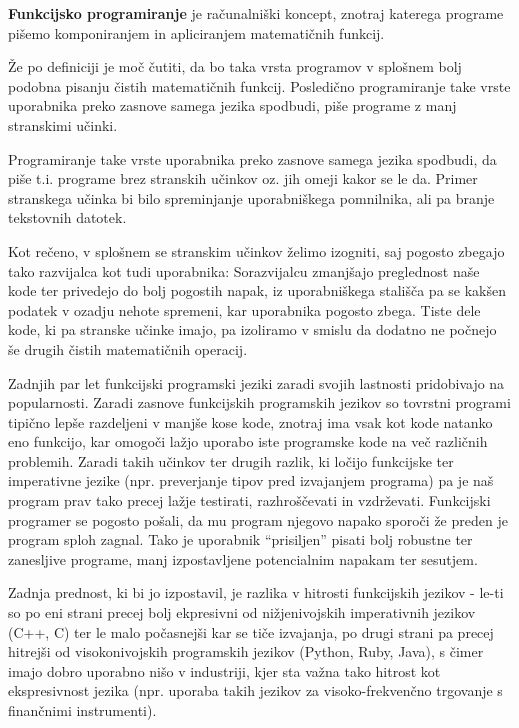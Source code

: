 \documentclass[mat1, tisk]{fmfdelo}
\begin{document}
\begin{definicija}
  \textbf{Funkcijsko programiranje} je računalniški koncept, znotraj katerega programe pišemo komponiranjem in apliciranjem matematičnih funkcij. 
\end{definicija}

Že po definiciji je moč čutiti, da bo taka vrsta programov v splošnem bolj podobna pisanju čistih matematičnih funkcij. Posledično programiranje take vrste uporabnika preko zasnove samega jezika
spodbudi, piše programe z manj stranskimi učinki.

Programiranje take vrste uporabnika preko zasnove samega jezika spodbudi, da piše t.i. programe brez stranskih učinkov oz. jih omeji kakor se le da. 
Primer stranskega učinka bi bilo spreminjanje uporabniškega pomnilnika, ali pa branje tekstovnih datotek.

Kot rečeno, v splošnem se stranskim učinkov želimo izogniti, saj pogosto zbegajo tako razvijalca kot tudi uporabnika: 
Sorazvijalcu zmanjšajo preglednost naše kode ter privedejo do bolj pogostih napak, iz uporabniškega stališča pa se kakšen podatek v ozadju nehote spremeni, kar uporabnika pogosto zbega. 
Tiste dele kode, ki pa stranske učinke imajo, pa izoliramo v smislu da dodatno ne počnejo še drugih čistih matematičnih operacij.


Zadnjih par let funkcijski programski jeziki zaradi svojih lastnosti pridobivajo na popularnosti. 
Zaradi zasnove funkcijskih programskih jezikov so tovrstni programi tipično lepše razdeljeni v manjše kose kode, znotraj ima vsak kot kode natanko eno funkcijo, 
kar omogoči lažjo uporabo iste programske kode na več različnih problemih. 
Zaradi takih učinkov ter drugih razlik, ki ločijo funkcijske ter imperativne jezike (npr. preverjanje tipov pred izvajanjem programa) pa je naš program prav tako precej lažje testirati, razhroščevati in vzdrževati. 
Funkcijski programer se pogosto pošali, da mu program njegovo napako sporoči že preden je program sploh zagnal. 
Tako je uporabnik ``prisiljen'' pisati bolj robustne ter zanesljive programe, manj izpostavljene potencialnim napakam ter sesutjem.

Zadnja prednost, ki bi jo izpostavil, je razlika v hitrosti funkcijskih jezikov - le-ti so po eni strani precej bolj ekpresivni od nižjenivojskih imperativnih jezikov (C++, C) 
ter le malo počasnejši kar se tiče izvajanja, po drugi strani pa precej  hitrejši od visokonivojskih programskih jezikov (Python, Ruby, Java), 
s čimer imajo dobro uporabno nišo v industriji, kjer sta važna tako hitrost kot ekspresivnost jezika (npr. uporaba takih jezikov za visoko-frekvenčno trgovanje s finančnimi instrumenti).
\end{document}
